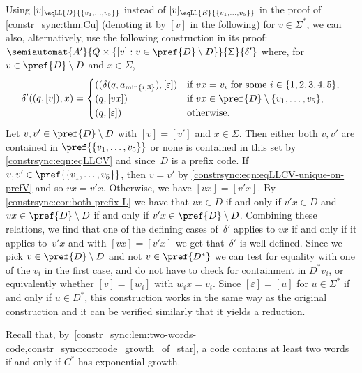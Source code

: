 \begin{remark}
	Using $[v]_{\eqLL{D}{\{v_1, \ldots, v_5\}}}$
	instead of $[v]_{\eqLL{E}{\{v_1, \ldots, v_5\}}}$
	in the proof of \cref{constr_sync:thm:Cu} (denoting it by $[v]$
	in the following) for $v \in \Sigma^*$,
	we can also, alternatively, use the following
	construction in its proof: $\semiautomat{A'}{Q \times \{ [v] : v \in \pref{D} \setminus D \}}{\Sigma}{\delta'}$
		where, for $v \in \pref{D} \setminus D$ and $x \in \Sigma$,
		\[
		\delta'((q, [v]), x)
		=
		\begin{cases} 
			((\delta(q, a_{\min\{i,3\}}), [\varepsilon]) & \text{if } vx =v_i \text{ for some } i \in \{1,2,3,4,5\}, \\
			(q, [vx])                        & \text{if } vx \in \pref{D} \setminus \{v_1, \ldots, v_5\}, \\
			(q, [\varepsilon])               & \text{otherwise.}
		\end{cases}
		\]		
		Let $v, v' \in \pref{D} \setminus D$ with $[v] = [v']$ and $x \in \Sigma$.		
		Then either both $v, v'$ are contained in $\pref{\{v_1,\ldots,v_5\}}$
		or none is contained in this set
		by \cref{constrsync:eqn:eqLLCV} 
		and since~$D$ is a prefix code.		
		If $v,v' \in \pref{\{v_1,\ldots,v_5\}}$,
		then $v = v'$ by \cref{constrsync:eqn:eqLLCV-unique-on-prefV} 
		and so $vx = v'x$.
		Otherwise, we have $[vx] = [v'x]$.
		By \cref{constrsync:cor:both-prefix-L}
		we have that $vx \in D$ if and only if $v'x \in D$
		and $vx \in \pref{D} \setminus D$ if and only if $v'x \in \pref{D} \setminus D$.
		Combining these relations, we find that 
		one of the defining cases of~$\delta'$ applies to $vx$
		if and only if it applies to~$v'x$
		and with $[vx] = [v'x]$ we get that~$\delta'$ is well-defined.
		Since we pick $v \in \pref{D} \setminus D$ and 
		not $v \in \pref{D^*}$ we can test for equality with one of the $v_i$
		in the first case, and do not have to check for containment in $D^*v_i$, or equivalently
		whether $[v] = [w_i]$ with $w_ix = v_i$.
		Since $[\varepsilon] = [u]$ for $u \in \Sigma^*$ if and only if $u \in D^*$,
		this construction works in the same way as the original construction
		and it can be verified similarly that it yields a reduction.		
\end{remark}

Recall that, by~\cref{constr_sync:lem:two-words-code,constr_sync:cor:code_growth_of_star},
a code contains at least two words if and only if $C^*$ has exponential growth.

